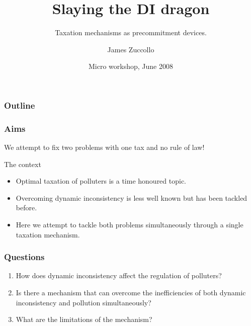 \documentclass{beamer}
\title[Taxing for time consistency]{Slaying the DI dragon}
\subtitle{Taxation mechanisms as precommitment devices.}
\author[Zuccollo]{James Zuccollo}
\institute[VUW]{Victoria University of Wellington}
\date[Micro workshop]{Micro workshop, June 2008}
\begin{document}
\begin{frame}
  \titlepage
\end{frame}

\begin{frame}
  \frametitle{Outline}
  \tableofcontents[pausesections]
\end{frame}





\begin{frame}
  \frametitle{Aims}
  We attempt to fix two problems with one tax and no rule of law!
\begin{block}{The context}
  \begin{itemize}
  \item<1-> Optimal taxation of polluters is a time honoured topic.
  \item<1-> Overcoming dynamic inconsistency is less well known but
    has been tackled before.
  \item<2-> Here we attempt to tackle both problems simultaneously
    through a single taxation mechanism.
  \end{itemize}
\end{block}
\end{frame}

\begin{frame}
  \frametitle{Questions} 
  \begin{enumerate}
    \item<1-> How does dynamic inconsistency affect the regulation of polluters?
    \item<2-> Is there a mechanism that can overcome the
      inefficiencies of both dynamic inconsistency and pollution simultaneously?
    \item<3-> What are the limitations of the mechanism?
    \end{enumerate}
  \end{frame}
\end{document}
